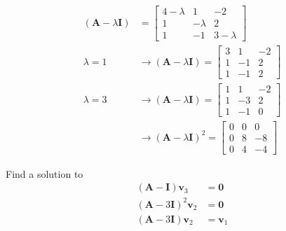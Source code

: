 \begin{align*}
 (\mathbf{A}-\lambda\mathbf{I}) &= \begin{bmatrix}
                                    4-\lambda & 1 & -2\\
                                    1 & -\lambda &2\\
                                    1 & -1 & 3 -\lambda
                                   \end{bmatrix}
\\
 \lambda = 1 & \rightarrow (\mathbf{A}-\lambda\mathbf{I}) = \begin{bmatrix}
                                    3 & 1 & -2\\
                                    1 & -1 &2\\
                                    1 & -1 & 2
                                   \end{bmatrix}
\\
 \lambda = 3 & \rightarrow (\mathbf{A}-\lambda\mathbf{I}) = \begin{bmatrix}
                                      1 & 1 & -2\\
                                      1 & -3 & 2\\
                                      1 & -1 & 0
                                     \end{bmatrix}\\
& \rightarrow (\mathbf{A}-\lambda\mathbf{I})^2 = \begin{bmatrix}
                                      0 & 0 & 0\\
                                      0 & 8 &-8\\
                                      0 & 4 & -4
                                     \end{bmatrix}
\end{align*}

Find a solution to
\begin{align*}
(\mathbf{A}- \mathbf{I}) \mathbf{v}_3& = \mathbf{0} \\
(\mathbf{A}-3 \mathbf{I})^2 \mathbf{v}_2 & = \mathbf{0} \\
(\mathbf{A}- 3\mathbf{I}) \mathbf{v}_2& = \mathbf{v}_1 \\
\end{align*}

